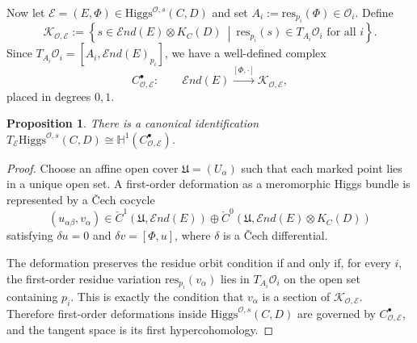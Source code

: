 \documentclass[11pt]{amsart}
\theoremstyle{plain}
\newtheorem{proposition}[theorem]{Proposition}
\theoremstyle{definition}
\theoremstyle{remark}
\newcommand{\End}{\mathcal E nd}
\newcommand{\HH}{\mathbb H}
\newcommand{\cO}{\mathcal O}
\newcommand{\cK}{\mathcal K}
\newcommand{\Higgs}{\mathrm{Higgs}}
\def\res{\mathrm{res}}
\begin{document}
\noindent Now let $\mathcal E=(E,\Phi)\in\Higgs^{\cO,s}(C,D)$ and set
$A_i:=\res_{p_i}(\Phi)\in\cO_i$. Define
\[
\cK_{\cO,\mathcal E}
:=
\left\{
s\in\End(E)\otimes K_C(D)
\ \middle|\
\res_{p_i}(s)\in T_{A_i}\cO_i
\text{ for all }i
\right\}.
\]
Since $T_{A_i}\cO_i=[A_i, \End(E)_{p_i}]$, we have a well-defined complex 
\[
C_{\cO,\mathcal E}^\bullet:
\qquad
\End(E)\xrightarrow{[\Phi,\cdot]}\cK_{\cO,\mathcal E},
\]
 placed in degrees $0,1$. 

\begin{proposition}\label{prop:tangent-CO}
	There is a canonical identification $T_{\mathcal E}\Higgs^{\cO,s}(C,D)\cong \HH^1(C_{\cO,\mathcal E}^\bullet)$.
\end{proposition}

\begin{proof}
	Choose an affine open cover $\mathfrak U=(U_\alpha)$ such that each marked point lies in a unique open set. A first-order deformation as a meromorphic Higgs bundle is represented by a \v Cech cocycle
	\[
	(u_{\alpha\beta},v_\alpha)\in
	\check C^1(\mathfrak U,\End(E))
	\oplus
	\check C^0(\mathfrak U,\End(E)\otimes K_C(D))
	\]
	satisfying $\delta u=0$ and $\delta v=[\Phi,u]$, where $\delta$ is a \v Cech differential. 

	The deformation preserves the residue orbit condition if and only if, for every $i$, the first-order residue variation $\res_{p_i}(v_\alpha)$ lies in $T_{A_i}\cO_i$ on the open set containing $p_i$. This is exactly the condition that $v_\alpha$ is a section of $\cK_{\cO,\mathcal E}$. Therefore first-order deformations inside $\Higgs^{\cO,s}(C,D)$ are governed by $C_{\cO,\mathcal E}^\bullet$, and the tangent space is its first hypercohomology.
\end{proof}
\end{document}
